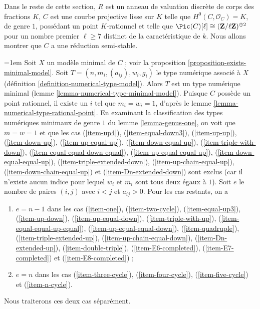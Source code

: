 \medskip\noindent
Dans le reste de cette section, $R$ est un anneau de valuation discrète de
corps des fractions $K$, $C$ est une courbe projective lisse sur $K$ telle
que $H^0(C,\mathcal{O}_C)=K$, de genre $1$, possédant un point
$K$-rationnel et telle que
$\Pic(C)[\ell]\cong(\mathbf{Z}/\ell\mathbf{Z})^{\oplus2}$ pour un nombre
premier $\ell\geq7$ distinct de la caractéristique de $k$. Nous allons
montrer que $C$ a une réduction semi-stable.

\medskip\noindent
\begingroup
\emergencystretch=1em
Soit $X$ un modèle minimal de $C$ ; voir la proposition
\ref{proposition-exists-minimal-model}. Soit
$T=(n,\allowbreak{}m_i,\allowbreak{}(a_{ij}),\allowbreak{}w_i,\allowbreak{}g_i)$ le type numérique associé à $X$
(définition \ref{definition-numerical-type-model}). Alors $T$ est un type
numérique minimal (lemme \ref{lemma-numerical-type-minimal-model}).
Puisque $C$ possède un point rationnel, il existe un $i$ tel que
$m_i=w_i=1$, d'après le lemme
\ref{lemma-numerical-type-rational-point}. En examinant la classification
des types numériques minimaux de genre $1$ du lemme
\ref{lemma-genus-one}, on voit que $m=w=1$ et que les cas
(\ref{item-up4}),
(\ref{item-equal-down3}),
(\ref{item-up-up}),
(\ref{item-down-up}),
(\ref{item-up-equal-up}),
(\ref{item-down-equal-up}),
(\ref{item-triple-with-down}),
(\ref{item-equal-equal-down-equal}),
(\ref{item-up-equal-equal-up}),
(\ref{item-down-equal-equal-up}),
(\ref{item-triple-extended-down}),
(\ref{item-up-chain-equal-up}),
(\ref{item-down-chain-equal-up}) et
(\ref{item-Dn-extended-down}) sont exclus (car il n'existe aucun indice
pour lequel $w_i$ et $m_i$ sont tous deux égaux à $1$). Soit $e$ le nombre de paires $(i,j)$
avec $i<j$ et $a_{ij}>0$. Pour les cas restants, on a
\par
\endgroup
\begin{enumerate}
\item[(A)] $e=n-1$ dans les cas
(\ref{item-one}),
(\ref{item-two-cycle}),
(\ref{item-equal-up3}),
(\ref{item-up-down}),
(\ref{item-up-equal-down}),
(\ref{item-triple-with-up}),
(\ref{item-equal-equal-up-equal}),
(\ref{item-up-equal-equal-down}),
(\ref{item-quadruple}),
(\ref{item-triple-extended-up}),
(\ref{item-up-chain-equal-down}),
(\ref{item-Dn-extended-up}),
(\ref{item-double-triple}),
(\ref{item-E6-completed}),
(\ref{item-E7-completed}) et
(\ref{item-E8-completed}) ;
\item[(B)] $e=n$ dans les cas
(\ref{item-three-cycle}),
(\ref{item-four-cycle}),
(\ref{item-five-cycle}) et
(\ref{item-n-cycle}).
\end{enumerate}
Nous traiterons ces deux cas séparément.

